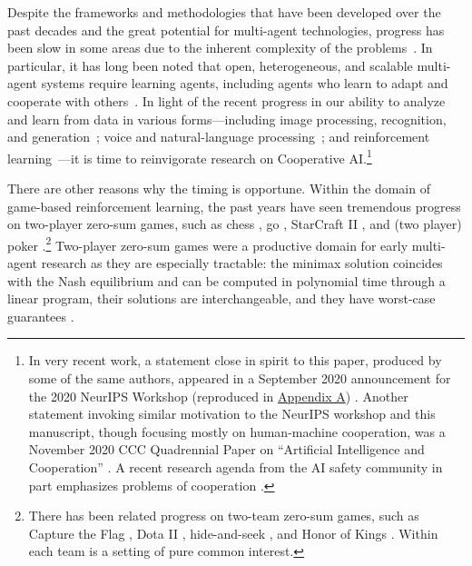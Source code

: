 \documentclass[11pt, a4paper, logo, onecolumn, nonumbering]{deepmind}
\begin{document}
Despite the frameworks and methodologies that have been developed over the past decades and the great potential for multi-agent technologies, progress has been slow in some areas due to the inherent complexity of the problems~\cite{jennings1998roadmap,weiss1999multiagent,singh2007multiagent,shoham2008multiagent,wooldridge2009introduction}. In particular, it has long been noted that open, heterogeneous, and scalable multi-agent systems require learning agents, including agents who learn to adapt and cooperate with others~\cite{luck2003agent}.
In light of the recent  progress in our ability to analyze and learn from data in various forms---including image processing, recognition, and generation~\cite{krizhevsky2012imagenet,goodfellow2014generative}; voice and natural-language processing~\cite{collobert2011natural,oord2016wavenet,pennington2014glove}; and reinforcement learning~\cite{mnih2015human,silver2016mastering,berner2019dota}---it is time to reinvigorate research on Cooperative AI.\footnote{In very recent work, a statement close in spirit to this paper, produced by some of the same authors, appeared in a September 2020 announcement for the 2020 NeurIPS Workshop (reproduced in \hyperref[section:appendixA]{Appendix A}) \cite{cooperativeAIcom}. Another statement invoking similar motivation to the NeurIPS workshop and this manuscript, though focusing mostly on human-machine cooperation, was a November 2020 CCC Quadrennial Paper on ``Artificial Intelligence and Cooperation'' \cite{AIandCooperation}. A recent research agenda from the AI safety community in part emphasizes problems of cooperation \cite{critch2020ai}.}

There are other reasons why the timing is opportune. Within the domain of game-based reinforcement learning, the past years have seen tremendous progress on two-player zero-sum games, such as chess \cite{silver2018general, lai2015giraffe}, go \cite{silver2018general}, StarCraft II \cite{vinyals2019grandmaster}, and (two player) poker \cite{brownbakhtin2020}.\footnote{There has been related progress on two-team zero-sum games, such as Capture the Flag \cite{jaderberg2019human}, Dota II \cite{berner2019dota}, hide-and-seek \cite{baker2019emergent}, and Honor of Kings \cite{ye2020towards}. Within each team is a setting of pure common interest.}
Two-player zero-sum games were a productive domain for early multi-agent research as they are especially tractable: the minimax solution coincides with the Nash equilibrium and can be computed in polynomial time through a linear program, their solutions are interchangeable, and they have worst-case guarantees \cite{von2007theory}.
\end{document}

